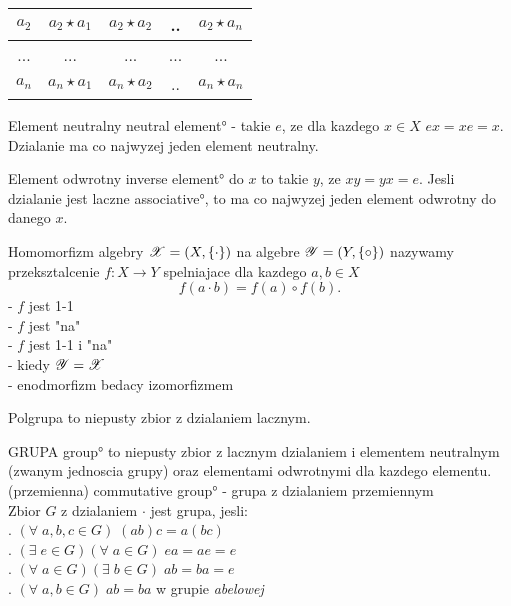 \begin{multicols}{2}
\begin{center}
\begin{tabular}{ c | c | c | c | c |}
        $a_2$ & $a_2\star a_1$ & $a_2\star a_2$ & .. & $a_2\star a_n$\\

        \hline

        ... & ... & ... & ... & ... \\
        
        \hline

        $a_n$ & $a_n\star a_1$ & $a_n\star a_2$ & .. & $a_n\star a_n$\\

        \hline
        
    \end{tabular}
    \end{center}

    {\color{def}Element neutralny} \ang{neutral element} - takie $e$, ze dla kazdego $x\in X$ $ex=xe=x$. Dzialanie ma co najwyzej jeden element neutralny.\smallskip
    
    {\color{def}Element odwrotny} \ang{inverse element} do $x$ to takie $y$, ze $xy=yx=e$. Jesli dzialanie jest laczne \ang{associative}, to ma co najwyzej jeden element odwrotny do danego $x$.\medskip

    \medskip

    {\color{def}Homomorfizm} algebry $\mathcal{X}=(X,\{ \cdot\})$ na algebre $\mathcal{Y}=(Y,\{\circ\})$ nazywamy przeksztalcenie $f:X\to Y$ spelniajace dla kazdego $a, b\in X$
    $$f(a\cdot b)=f(a)\circ f(b).$$
     - $f$ jest 1-1\smallskip\\
     - $f$ jest "na"\smallskip\\
     - $f$ jest 1-1 i "na"\smallskip\\
     - kiedy $\mathcal{Y}=\mathcal{X}$\smallskip\\
     - enodmorfizm bedacy izomorfizmem\medskip

    \medskip

    {\color{def}Polgrupa} to niepusty zbior z dzialaniem lacznym.\medskip
    
    {\color{def}GRUPA} \ang{group} to niepusty zbior z lacznym dzialaniem i elementem neutralnym (zwanym {\color{acc}jednoscia grupy}) oraz elementami odwrotnymi dla kazdego elementu.\smallskip\\
     (przemienna) \ang{commutative group} - grupa z dzialaniem przemiennym\smallskip\\
    Zbior $G$ z dzialaniem $\cdot$ jest grupa, jesli:\smallskip\\
    . $(\forall\;a,b,c\in G)\;(ab)c=a(bc)$\\
    . $(\exists\;e\in G)(\forall\;a\in G)\;ea=ae=e$\\
    . $(\forall\;a\in G)(\exists\;b\in G)\;ab=ba=e$\\
    . $(\forall\;a,b\in G)\;ab=ba$ w grupie \emph{abelowej}\medskip


\end{multicols}
